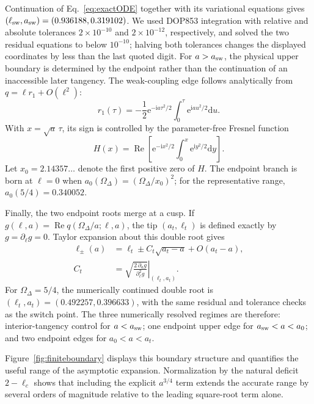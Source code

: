 \documentclass[reprint,superscriptaddress,floatfix,amsmath,amssymb,prresearch,aps]{revtex4-2}
\newcommand{\dd}{\mathrm{d}}
\newcommand{\ee}{\mathrm{e}}
\newcommand{\ii}{\mathrm{i}}
\newcommand{\Ree}{\operatorname{Re}}
\begin{document}
Continuation of Eq.~\eqref{eq:exactODE} together with its variational
equations gives
\((\ell_{\rm sw},a_{\rm sw})=(0.936188,0.319102)\).
We used DOP853 integration with relative and absolute tolerances
\(2\times10^{-10}\) and \(2\times10^{-12}\), respectively, and solved the
two residual equations to below \(10^{-10}\); halving both tolerances changes
the displayed coordinates by less than the last quoted digit.
For \(a>a_{\rm sw}\), the physical upper boundary is determined by the
endpoint rather than the continuation of an inaccessible later tangency. The weak-coupling edge follows analytically from
\(q=\ell r_1+O(\ell^2)\):
\begin{equation}
r_1(\tau)=-\frac12\ee^{-\ii a\tau^2/2}
\int_0^\tau\ee^{\ii au^2/2}\dd u.
\label{eq:weakcoupling}
\end{equation}
With \(x=\sqrt a\,\tau\), its sign is controlled by the parameter-free
Fresnel function
\begin{equation}
H(x)=\Ree\left[
\ee^{-\ii x^2/2}\int_0^x\ee^{\ii y^2/2}\dd y
\right].
\label{eq:Fresnelfunction}
\end{equation}
Let \(x_0=2.14357\ldots\) denote the first positive zero of \(H\). The
endpoint branch is born at \(\ell=0\) when
\(a_0(\Omega_\Delta)=(\Omega_\Delta/x_0)^2\); for the representative range,
\(a_0(5/4)=0.340052\).

Finally, the two endpoint roots merge at a cusp. If
\(g(\ell,a)=\Ree q(\Omega_\Delta/a;\ell,a)\), the tip
\((a_t,\ell_t)\) is defined exactly by \(g=\partial_\ell g=0\).
Taylor expansion about this double root gives
\begin{align}
\ell_\pm(a)&=\ell_t\pm C_t\sqrt{a_t-a}+O(a_t-a),
\nonumber\\
C_t&=\left.
\sqrt{\frac{2\,\partial_a g}{\partial_\ell^2g}}
\right|_{(\ell_t,a_t)}.
\label{eq:endpointcusp}
\end{align}
For \(\Omega_\Delta=5/4\), the numerically continued double root is
\((\ell_t,a_t)=(0.492257,0.396633)\),
with the same residual and tolerance checks as the switch point.
The three numerically resolved regimes are therefore: interior-tangency control for
\(a<a_{\rm sw}\); one endpoint upper edge for
\(a_{\rm sw}<a<a_0\); and two endpoint edges for \(a_0<a<a_t\).

Figure~\ref{fig:finiteboundary} displays this boundary structure and
quantifies the useful range of the asymptotic expansion. Normalization by the
natural deficit \(2-\ell_c\) shows that including the explicit
\(a^{3/4}\) term extends the accurate range by several orders of magnitude
relative to the leading square-root term alone.
\end{document}
